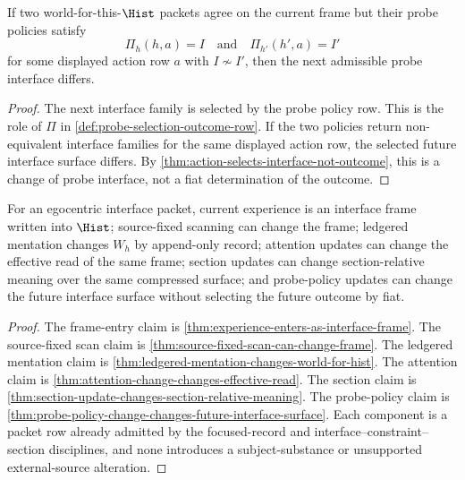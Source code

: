 \begin{theorem}
\label{thm:probe-policy-change-changes-future-interface-surface}
If two world-for-this-$\Hist$ packets agree on the current frame but their
probe policies satisfy
$$
\Pi_h(h,a)=I
\quad\text{and}\quad
\Pi_{h'}(h',a)=I'
$$
for some displayed action row $a$ with $I\not\sim I'$, then the next
admissible probe interface differs.
\end{theorem}

\begin{proof}
The next interface family is selected by the probe policy row. This is the
role of $\Pi$ in \autoref{def:probe-selection-outcome-row}. If the two
policies return non-equivalent interface families for the same displayed
action row, the selected future interface surface differs. By
\autoref{thm:action-selects-interface-not-outcome}, this is a change of
probe interface, not a fiat determination of the outcome.
\end{proof}

\begin{theorem}
\label{thm:egocentric-mentation-synthesis}
For an egocentric interface packet, current experience is an interface
frame written into $\Hist$; source-fixed scanning can change the frame;
ledgered mentation changes $W_h$ by append-only record; attention updates
can change the effective read of the same frame; section updates can
change section-relative meaning over the same compressed surface; and
probe-policy updates can change the future interface surface without
selecting the future outcome by fiat.
\end{theorem}

\begin{proof}
The frame-entry claim is \autoref{thm:experience-enters-as-interface-frame}.
The source-fixed scan claim is \autoref{thm:source-fixed-scan-can-change-frame}.
The ledgered mentation claim is
\autoref{thm:ledgered-mentation-changes-world-for-hist}. The attention
claim is \autoref{thm:attention-change-changes-effective-read}. The
section claim is
\autoref{thm:section-update-changes-section-relative-meaning}. The
probe-policy claim is
\autoref{thm:probe-policy-change-changes-future-interface-surface}. Each
component is a packet row already admitted by the focused-record and
interface--constraint--section disciplines, and none introduces a
subject-substance or unsupported external-source alteration.
\end{proof}

